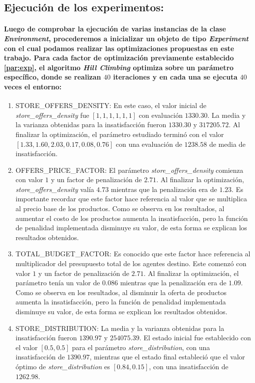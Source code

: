 \documentclass[12pt]{amsart}
\begin{document}
\vskip 5cm

\subsection{Ejecución de los experimentos:}

\paragraph{Luego de comprobar la ejecución de varias instancias de la clase \textit{Environment}, procederemos a inicializar un objeto de tipo \textit{Experiment} con el cual podamos realizar las optimizaciones propuestas en este trabajo. Para cada factor de optimización previamente establecido \ref{par:exp}, el algoritmo \textit{Hill Climbing} optimiza sobre un parámetro específico, donde se realizan $40$ iteraciones y en cada una se ejecuta $40$ veces el entorno:}

\begin {enumerate}
				\item {STORE\_OFFERS\_DENSITY:  En este caso, el valor inicial de \textit{store\_offers\_density} fue $[1, 1, 1, 1, 1, 1]$ con evaluación $1330.30$. La media y la varianza obtenidas para la insatisfacción fueron $1330.30$ y $317205.72$. Al finalizar la optimización, el parámetro estudiado terminó con el valor $[1.33, 1.60, 2.03, 0.17, 0.08, 0.76]$ con una evaluación de $1238.58$ de media de insatisfacción.}
				\item {OFFERS\_PRICE\_FACTOR: El parámetro \textit{store\_offers\_density} comienza con valor $1$ y un factor de penalización de $2.71$. Al finalizar la optimización, \textit{store\_offers\_density} valía $4.73$ mientras que la penalización era de $1.23$. Es importante recordar que este factor hace referencia al valor que se multiplica al precio base de los productos. Como se observa en los resultados, al aumentar el costo de los productos aumenta la insatisfacción, pero la función de penalidad implementada disminuye su valor, de esta forma se explican los resultados obtenidos.}
				\item {TOTAL\_BUDGET\_FACTOR: Es conocido que este factor hace referencia al multiplicador del presupuesto total de los agentes destino. Este comenzó con valor $1$ y un factor de penalización de $2.71$. Al finalizar la optimización, el parámetro tenía un valor de $0.086$ mientras que la penalización era de $1.09$. Como se observa en los resultados, al disminuir la oferta de productos aumenta la insatisfacción, pero la función de penalidad implementada disminuye su valor, de esta forma se explican los resultados obtenidos.}
				\item {STORE\_DISTRIBUTION: La media y la varianza obtenidas para la insatisfacción fueron $1390.97$ y $254075.39$. El estado inicial fue establecido con el valor $[0.5, 0.5]$ para el parámetro \textit{store\_distribution}, con una insatisfacción de $1390.97$, mientras que el estado final estableció que el valor óptimo de \textit{store\_distribution} es $[0.84, 0.15]$, con una insatisfacción de $1262.98$.}
\end {enumerate}
\end{document}
